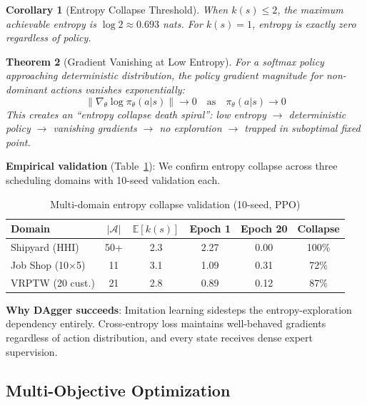 \documentclass[11pt,a4paper]{article}
\newtheorem{theorem}{Theorem}[section]
\newtheorem{corollary}[theorem]{Corollary}
\begin{document}
\begin{corollary}[Entropy Collapse Threshold]
When $k(s) \leq 2$, the maximum achievable entropy is $\log 2 \approx 0.693$ nats. For $k(s) = 1$, entropy is exactly zero regardless of policy.
\end{corollary}

\begin{theorem}[Gradient Vanishing at Low Entropy]
\label{thm:gradient_vanishing}
For a softmax policy approaching deterministic distribution, the policy gradient magnitude for non-dominant actions vanishes exponentially:
\begin{equation}
\|\nabla_\theta \log \pi_\theta(a|s)\| \to 0 \quad \text{as} \quad \pi_\theta(a|s) \to 0
\end{equation}
This creates an ``entropy collapse death spiral'': low entropy $\to$ deterministic policy $\to$ vanishing gradients $\to$ no exploration $\to$ trapped in suboptimal fixed point.
\end{theorem}

\textbf{Empirical validation} (Table~\ref{tab:multi_domain_entropy}): We confirm entropy collapse across three scheduling domains with 10-seed validation each.

\begin{table}[h]
\centering
\caption{Multi-domain entropy collapse validation (10-seed, PPO)}
\label{tab:multi_domain_entropy}
\begin{tabular}{lccccc}
\toprule
Domain & $|\mathcal{A}|$ & $\mathbb{E}[k(s)]$ & Epoch 1 & Epoch 20 & Collapse \\
\midrule
Shipyard (HHI) & 50+ & 2.3 & 2.27 & 0.00 & 100\% \\
Job Shop (10$\times$5) & 11 & 3.1 & 1.09 & 0.31 & 72\% \\
VRPTW (20 cust.) & 21 & 2.8 & 0.89 & 0.12 & 87\% \\
\bottomrule
\end{tabular}
\end{table}

\textbf{Why DAgger succeeds}: Imitation learning sidesteps the entropy-exploration dependency entirely. Cross-entropy loss maintains well-behaved gradients regardless of action distribution, and every state receives dense expert supervision.

\subsection{Multi-Objective Optimization}
\end{document}
